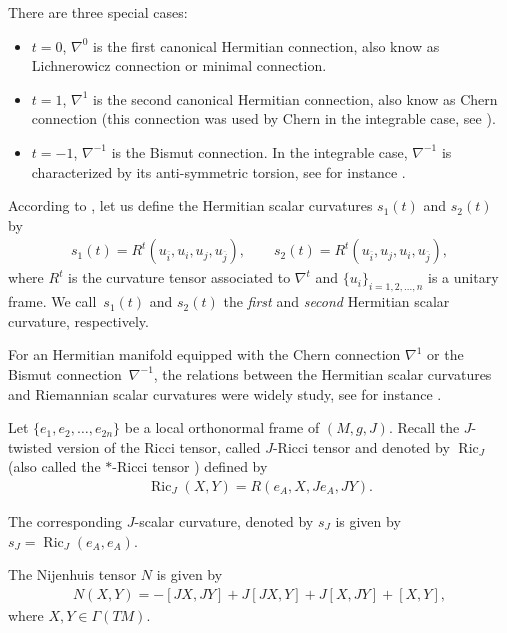 \documentclass[10pt,a4paper]{amsart}
\numberwithin{equation}{section}
\DeclareMathOperator{\Ric}{Ric}
\begin{document}
There are three special cases:
\begin{itemize}\itemsep=0pt\samepage
\item[$(i)$]$t=0$, $\nabla^{0}$ is the first canonical Hermitian connection, also know as Lichnerowicz connection or minimal connection.

\item[$(ii)$] $t=1$, $\nabla^{1}$ is the second canonical Hermitian connection, also know as Chern connection (this connection was used by Chern in the integrable case, see \cite{ch}).

\item[$(iii)$] $t=-1$, $\nabla^{-1}$ is the Bismut connection. In the integrable case, $\nabla^{-1}$ is characterized by its anti-symmetric torsion, see for instance \cite{ivanov,papa}.
\end{itemize}

According to \cite{fu}, let us define the Hermitian scalar curvatures $s_{1}(t)$ and $s_{2}(t)$ by
\begin{gather*}
s_{1}(t)=R^{t}(u_{\overline{i}},u_{i},u_{j},u_{\overline{j}}),
\qquad
s_{2}(t)=R^{t}(u_{\overline{i}},u_{j},u_{i},u_{\overline{j}}),
\end{gather*}
where $R^{t}$ is the curvature tensor associated to $\nabla^{t}$ and $\{u_{i}\}_{i=1,2,\dots,n}$ is a unitary frame. We call~$s_{1}(t)$ and $s_{2}(t)$ the {\em first} and {\em second} Hermitian scalar curvature, respectively.

For an Hermitian manifold equipped with the Chern connection $\nabla^{1}$ or the Bismut connection~$\nabla^{-1}$, the relations between the Hermitian scalar curvatures and Riemannian scalar curvatures were widely study, see for instance \cite{gau2,liu}.


Let $\{e_{1}, e_{2}, \dots, e_{2n}\}$ be a local orthonormal frame of $(M, g, J)$. Recall the $J$-twisted version of the Ricci tensor, called $J$-Ricci tensor and denoted by $\Ric_J$ (also called the $*$-Ricci tensor \cite{fu,sub,tri}) defined by
\begin{gather*}
\Ric_{J}(X, Y ) = R(e_{A}, X, J e_{A}, JY ).
\end{gather*}

The corresponding $J$-scalar curvature, denoted by $s_{J}$ is given by $s_{J} = \Ric_{J}(e_{A}, e_{A})$.

The Nijenhuis tensor $N$ is given by
\begin{gather*}
N(X,Y)=-[JX,JY]+J[JX,Y]+J[X,JY]+[X,Y],
\end{gather*}
where $X,Y\in \Gamma(TM)$.
\end{document}
